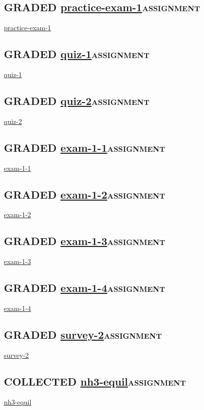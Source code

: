 \documentclass[11pt]{article}
\begin{document}
\subsection{{\bfseries\sffamily GRADED} \url{practice-exam-1}\hfill{}\textsc{assignment}}
\label{practice-exam-1}
\url{practice-exam-1}

\subsection{{\bfseries\sffamily GRADED} \url{quiz-1}\hfill{}\textsc{assignment}}
\label{quiz-1}
\url{quiz-1}

\subsection{{\bfseries\sffamily GRADED} \url{quiz-2}\hfill{}\textsc{assignment}}
\label{quiz-2}
\url{quiz-2}


\subsection{{\bfseries\sffamily GRADED} \url{exam-1-1}\hfill{}\textsc{assignment}}
\label{exam-1-1}
\url{exam-1-1}

\subsection{{\bfseries\sffamily GRADED} \url{exam-1-2}\hfill{}\textsc{assignment}}
\label{exam-1-2}
\url{exam-1-2}

\subsection{{\bfseries\sffamily GRADED} \url{exam-1-3}\hfill{}\textsc{assignment}}
\label{exam-1-3}
\url{exam-1-3}

\subsection{{\bfseries\sffamily GRADED} \url{exam-1-4}\hfill{}\textsc{assignment}}
\label{exam-1-4}
\url{exam-1-4}

\subsection{{\bfseries\sffamily GRADED} \url{survey-2}\hfill{}\textsc{assignment}}
\label{survey-2}
\url{survey-2}

\subsection{{\bfseries\sffamily COLLECTED} \url{nh3-equil}\hfill{}\textsc{assignment}}
\label{nh3-equil}
\url{nh3-equil}
\end{document}
